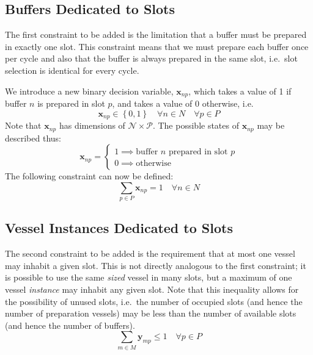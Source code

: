 \subsection{Buffers Dedicated to Slots}\label{SS.constr1}

The first constraint to be added is the limitation that a buffer must be
prepared in exactly one slot.
This constraint means that we must prepare each buffer once per cycle
and also that the buffer is always prepared in the same slot, i.e.\ slot
selection is identical for every cycle.

We introduce a new binary decision variable, $\boldsymbol{x}_{np}$, which takes
a value of 1 if buffer $n$ is prepared in slot $p$, and takes a value of 0
otherwise, i.e.
\begin{equation}
    \boldsymbol{x}_{np} \in \left\{ 0, 1 \right\} \quad \forall n \in N \quad
    \forall p \in P
    \label{eq.x}
\end{equation}
Note that $\boldsymbol{x}_{np}$ has dimensions of
$\mathcal{N} \times \mathcal{P}$.
The possible states of $\boldsymbol{x}_{np}$ may be described thus:
\begin{equation}
    \boldsymbol{x}_{np} =
    \begin{cases}
        1 \implies \text{buffer $n$ prepared in slot $p$}\\
        0 \implies \text{otherwise}
    \end{cases}
\end{equation}
The following constraint can now be defined:
\begin{equation}
    \sum_{p \in P} \boldsymbol{x}_{np} = 1 \quad \forall n \in N
    \label{eq.constr1}
\end{equation}

\subsection{Vessel Instances Dedicated to Slots}\label{SS.constr2}

The second constraint to be added is the requirement that at most one vessel
may inhabit a given slot.
This is not directly analogous to the first constraint; it is possible to
use the same \emph{sized} vessel in many slots, but a maximum of one vessel
\emph{instance} may inhabit any given slot.
Note that this inequality allows for the possibility of unused slots, i.e.\ the
number of occupied slots (and hence the number of preparation vessels) may be
less than the number of available slots (and hence the number of buffers).
\begin{equation}
    \sum_{m \in M} \boldsymbol{y}_{mp} \le 1 \quad \forall p \in P
    \label{eq.constr2}
\end{equation}


